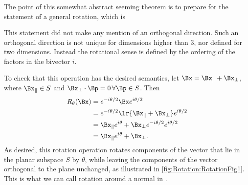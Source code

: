 
The point of this somewhat abstract seeming theorem is to prepare for the statement of a general  rotation, which is

This statement did not make any mention of an orthogonal direction.
Such an orthogonal direction is not unique for dimensions higher than 3, nor defined for two dimensions.
Instead the rotational sense is defined by the ordering of the factors in the bivector \( i \).

To check that this operation has the desired semantics,
let \( \Bx = \Bx_\parallel + \Bx_\perp \), where \( \Bx_\parallel \in S \) and \( \Bx_\perp \cdot \Bp = 0 \,\forall \Bp \in S \).
Then
\begin{equation}\label{eqn:generalRotation:1880}
\begin{aligned}
R_\theta(\Bx)
&= e^{ - i \theta/2 } \Bx e^{ i\theta/2 } \\
&= e^{ - i \theta/2 } \lr{ \Bx_\parallel + \Bx_\perp } e^{ i\theta/2 } \\
&= \Bx_\parallel e^{ i\theta } + \Bx_\perp e^{ - i \theta/2 } e^{ i\theta/2 } \\
&= \Bx_\parallel e^{ i\theta } + \Bx_\perp.
\end{aligned}
\end{equation}
As desired, this rotation operation
rotates components of the vector that lie in the planar subspace \( S \) by \( \theta \), while leaving the components of the vector orthogonal to the plane unchanged, as illustrated in \cref{fig:Rotation:RotationFig1}.
This is what we can call rotation around a normal in .

